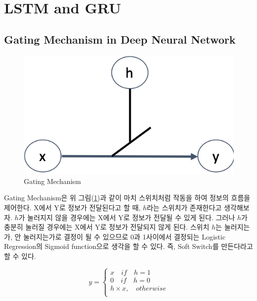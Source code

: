 \documentclass[draft=false]{oblivoir}
\begin{document}
\section{LSTM and GRU}

\subsection{Gating Mechanism in Deep Neural Network}

\begin{figure}[ht] \centering 
  \includegraphics[scale=0.5]{fig11.png}
  \caption{Gating Mechanism}
  \label{fig:16-11}
\end{figure}

Gating Mechanism은 위 그림(\ref{fig:16-11})과 같이 마치 스위치처럼 작동을 하여 정보의 흐름을 제어한다. X에서 Y로 정보가 전달된다고 할 때, $h$라는 스위치가 존재한다고 생각해보자. $h$가 눌러지지 않을 경우에는 X에서 Y로 정보가 전달될 수 있게 된다. 그러나 $h$가 충분히 눌러질 경우에는 X에서 Y로 정보가 전달되지 않게 된다. 스위치 $h$는 눌러지는가, 안 눌러지는가로 결정이 될 수 있으므로 0과 1사이에서 결정되는 Logistic Regression의 Sigmoid function으로 생각을 할 수 있다. 즉, Soft Switch를 만든다라고 할 수 있다.

\begin{equation}
  y = 
  \left\{
    \begin{array}{ll}
      x \quad if \quad h=1\\
      0 \quad if \quad h=0\\
      h\times x, \quad otherwise\\
    \end{array}
  \right.
  \label{eq:16-7}
\end{equation}
\end{document}
